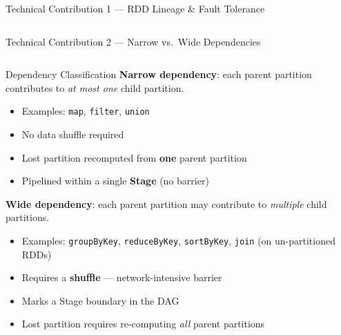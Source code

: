 \documentclass[aspectratio=169,10pt]{beamer}
\begin{document}
\begin{frame}{Technical Contribution 1 — RDD Lineage \& Fault Tolerance}
\begin{columns}[T]
\begin{center}
      \end{center}
  \end{columns}
\end{frame}

\begin{frame}{Technical Contribution 2 — Narrow vs.\ Wide Dependencies}
  \begin{columns}[T]
      \begin{block}{Dependency Classification}
        \textbf{Narrow dependency}: each parent partition contributes
        to \emph{at most one} child partition.
        \begin{itemize}
          \item Examples: \texttt{map}, \texttt{filter}, \texttt{union}
          \item No data shuffle required
          \item Lost partition recomputed from \textbf{one} parent partition
          \item Pipelined within a single \textbf{Stage} (no barrier)
        \end{itemize}
        \vspace{4pt}
        \textbf{Wide dependency}: each parent partition may contribute
        to \emph{multiple} child partitions.
        \begin{itemize}
          \item Examples: \texttt{groupByKey}, \texttt{reduceByKey},
                \texttt{sortByKey}, \texttt{join} (on un-partitioned RDDs)
          \item Requires a \textbf{shuffle} — network-intensive barrier
          \item Marks a Stage boundary in the DAG
          \item Lost partition requires re-computing \emph{all} parent partitions
        \end{itemize}
      \end{block}


\end{columns}
\end{frame}
\end{document}

